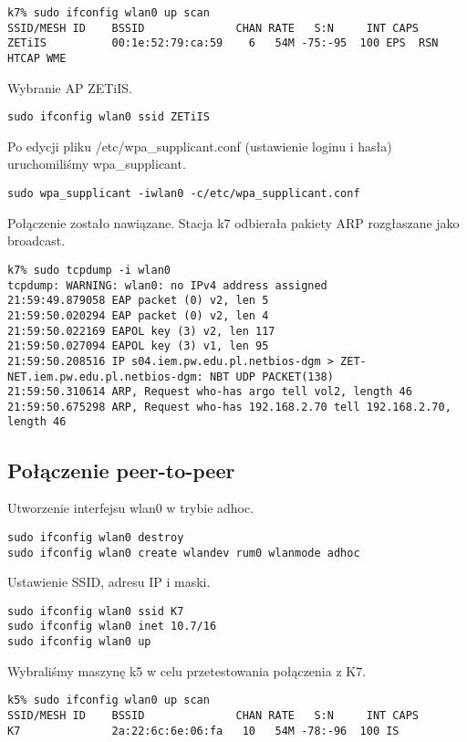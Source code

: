 \documentclass[a4paper,11pt,notitlepage]{article}
\begin{document}
\begin{verbatim}
k7% sudo ifconfig wlan0 up scan
SSID/MESH ID    BSSID              CHAN RATE   S:N     INT CAPS
ZETiIS          00:1e:52:79:ca:59    6   54M -75:-95  100 EPS  RSN HTCAP WME
\end{verbatim}

Wybranie AP ZETiIS.

\begin{verbatim}
sudo ifconfig wlan0 ssid ZETiIS
\end{verbatim}

Po edycji pliku /etc/wpa\_supplicant.conf (ustawienie loginu i hasła) uruchomiliśmy wpa\_supplicant.

\begin{verbatim}
sudo wpa_supplicant -iwlan0 -c/etc/wpa_supplicant.conf
\end{verbatim}

Połączenie zostało nawiązane. Stacja k7 odbierała pakiety ARP rozgłaszane jako broadcast.

\begin{verbatim}
k7% sudo tcpdump -i wlan0
tcpdump: WARNING: wlan0: no IPv4 address assigned
21:59:49.879058 EAP packet (0) v2, len 5
21:59:50.020294 EAP packet (0) v2, len 4
21:59:50.022169 EAPOL key (3) v2, len 117
21:59:50.027094 EAPOL key (3) v1, len 95
21:59:50.208516 IP s04.iem.pw.edu.pl.netbios-dgm > ZET-NET.iem.pw.edu.pl.netbios-dgm: NBT UDP PACKET(138)
21:59:50.310614 ARP, Request who-has argo tell vol2, length 46
21:59:50.675298 ARP, Request who-has 192.168.2.70 tell 192.168.2.70, length 46
\end{verbatim}
\subsection{Połączenie peer-to-peer}

Utworzenie interfejsu wlan0 w trybie adhoc.

\begin{verbatim}
sudo ifconfig wlan0 destroy
sudo ifconfig wlan0 create wlandev rum0 wlanmode adhoc
\end{verbatim}

Ustawienie SSID, adresu IP i maski.

\begin{verbatim}
sudo ifconfig wlan0 ssid K7
sudo ifconfig wlan0 inet 10.7/16
sudo ifconfig wlan0 up
\end{verbatim}

Wybraliśmy maszynę k5 w celu przetestowania połączenia z K7.
\begin{verbatim}
k5% sudo ifconfig wlan0 up scan
SSID/MESH ID    BSSID              CHAN RATE   S:N     INT CAPS
K7              2a:22:6c:6e:06:fa   10   54M -78:-96  100 IS
\end{verbatim}
\end{document}
